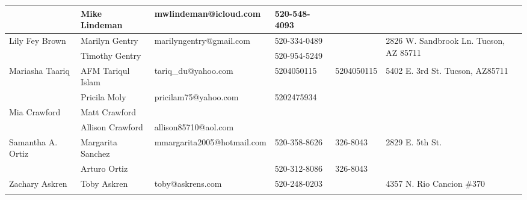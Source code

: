 \documentclass[landscape]{article}\usepackage[]{graphicx}\usepackage[]{color}
\begin{document}
\begin{longtable}{|p{100pt}|p{100pt}|p{140pt}|p{60pt}|p{64pt}|p{120pt}|}
 & Mike Lindeman & mwlindeman@icloud.com & 520-548-4093 &  & \\
\hline
\multirow{2}{100pt}{Lily Fey Brown} & Marilyn Gentry & marilyngentry@gmail.com & 520-334-0489 &  & \multirow{2}{120pt}{2826 W. Sandbrook Ln. Tucson, AZ 85711} \\
 & Timothy Gentry &  & 520-954-5249 &  & \\
\hline
\multirow{2}{100pt}{Mariasha Taariq} & AFM Tariqul Islam & tariq\_du@yahoo.com & 5204050115 & 5204050115 & \multirow{2}{120pt}{5402 E. 3rd St. Tucson, AZ85711} \\
 & Pricila Moly & pricilam75@yahoo.com & 5202475934 &  & \\
\hline
\multirow{2}{100pt}{Mia Crawford} & Matt Crawford &  &  &  & \multirow{2}{120pt}{} \\
 & Allison Crawford & allison85710@aol.com &  &  & \\
\hline
\multirow{2}{100pt}{Samantha A. Ortiz} & Margarita Sanchez & mmargarita2005@hotmail.com & 520-358-8626 & 326-8043 & \multirow{2}{120pt}{2829 E. 5th St.} \\
 & Arturo Ortiz &  & 520-312-8086 & 326-8043 & \\
\hline
\multirow{2}{100pt}{Zachary Askren} & Toby Askren & toby@askrens.com & 520-248-0203 &  & \multirow{2}{120pt}{4357 N. Rio Cancion \#370} \\
 &  &  &  &  & \\
\hline
\end{longtable}
\newpage
\end{document}
